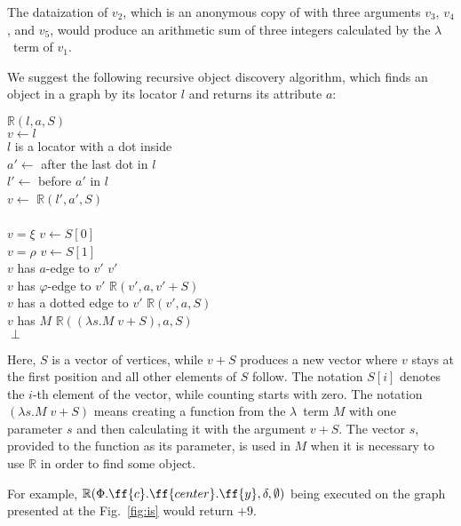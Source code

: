 The dataization of $v_2$, which is an anonymous copy of  with
three arguments $v_3$, $v_4$, and $v_5$, would produce an arithmetic
sum of three integers calculated by the $\lambda$~term of $v_1$.

We suggest the following recursive object discovery
algorithm, which finds an object in a graph by its locator $l$ and
returns its attribute $a$:

\begin{algo}
 $\mathbb{R}(l,a,S)$ \\
  \tab $v \gets l$ \\
  \tab {} $l$ is a locator with a dot inside \\
  \tab\tab $a' \gets$ after the last dot in $l$ \\
  \tab\tab $l' \gets$ before $a'$ in $l$ \\
  \tab\tab $v \gets$ $\mathbb{R}(l', a', S)$ \\
  \tab {} \\
  \tab {} $v = \xi$  $v \gets S[0]$ \\
  \tab {} $v = \rho$  $v \gets S[1]$ \\
  \tab {} $v$ has $a$-edge to $v'$   $v'$ \\
  \tab {} $v$ has $\varphi$-edge to $v'$   $\mathbb{R}(v', a, v' + S)$ \\
  \tab {} $v$ has a dotted edge to $v'$   $\mathbb{R}(v', a, S)$ \\
  \tab {} $v$ has $M$   $\mathbb{R}((\lambda s.M \; v + S), a, S)$ \\
  \tab {} $\perp$ \\
\end{algo}

Here, $S$ is a vector of vertices, while $v+S$ produces a new vector
where $v$ stays at the first position and all other elements of $S$ follow.
The notation $S[i]$ denotes the $i$-th element of the vector, while
counting starts with zero.
The notation $(\lambda s.M \; v + S)$ means creating a function from
the $\lambda$~term $M$ with one parameter $s$ and then calculating
it with the argument $v + S$. The vector $s$, provided to the
function as its parameter, is used in $M$ when it is necessary
to use $\mathbb{R}$ in order to find some object.

For example, $\mathbb{R}(\Phi.\ff{c}.\ff{center}.\ff{y},
\delta, \emptyset)$ being executed on the graph presented at the
Fig.~\ref{fig:is} would return $+9$.

